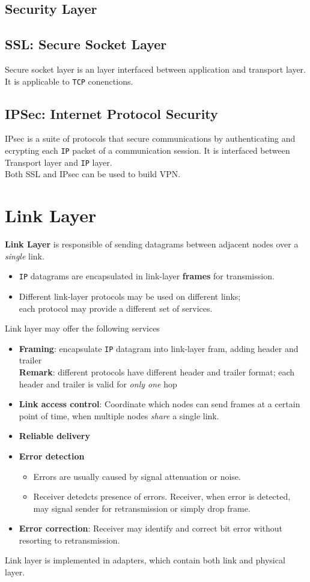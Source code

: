 \documentclass[12pt]{article}
\newcommand\TCP{\texttt{TCP} }
\newcommand\IP{\texttt{IP} }
\theoremstyle{definition}
\begin{document}
\subsection{Security Layer}
\subsection{SSL: Secure Socket Layer}
Secure socket layer is an layer interfaced between application and transport layer. It is applicable to \TCP conenctions.
\subsection{IPSec: Internet Protocol Security}
IPsec is a suite of protocols that secure communications by authenticating and ecrypting each \IP packet of a communication session. It is interfaced between Transport layer and \IP layer.\\Both SSL and IPsec can be used to build VPN. 
\clearpage
\section{Link Layer}
\textbf{Link Layer} is responsible of sending datagrams between adjacent nodes over a \textit{single} link.
\begin{itemize}
  \item \IP datagrams are encapsulated in link-layer \textbf{frames} for transmission.
  \item Different link-layer protocols may be used on different links;\\each protocol may provide a different set of services.
\end{itemize} 
Link layer may offer the following services
\begin{itemize}
  \item \textbf{Framing}: encapsulate \IP datagram into link-layer fram, adding header and trailer\\\textbf{Remark}: different protocols have different header and trailer format; each header and trailer is valid for \textit{only one} hop
  \item \textbf{Link access control}: Coordinate which nodes can send frames at a certain point of time, when multiple nodes \textit{share} a single link.
  \item \textbf{Reliable delivery}
  \item \textbf{Error detection}
  \begin{itemize}
    \item Errors are usually caused by signal attenuation or noise.
    \item Receiver detedcts presence of errors. Receiver, when error is detected, may signal sender for retransmission or simply drop frame.
  \end{itemize}
  \item \textbf{Error correction}: Receiver may identify and correct bit error without resorting to retransmission.
\end{itemize}
Link layer is implemented in adapters, which contain both link and physical layer.
\end{document}
